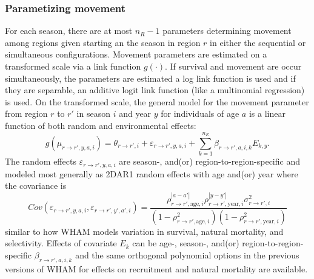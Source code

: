 \documentclass[
]{article}
\begin{document}
\hypertarget{parametizing-movement}{%
\subsubsection*{Parametizing movement}\label{parametizing-movement}}

For each season, there are at most \(n_R-1\) parameters determining
movement among regions given starting an the season in region \(r\) in
either the sequential or simultaneous configurations. Movement
parameters are estimated on a transformed scale via a link function
\(g(\cdot)\). If survival and movement are occur simultaneously, the
parameters are estimated a log link function is used and if they are
separable, an additive logit link function (like a multinomial
regression) is used. On the transformed scale, the general model for the
movement parameter from region \(r\) to \(r'\) in season \(i\) and year
\(y\) for individuals of age \(a\) is a linear function of both random
and environmental effects: \begin{equation*}
  g(\mu_{r\rightarrow r',y,a,i}) = \theta_{r\rightarrow r',i} + \varepsilon_{r\rightarrow r',y,a,i} + \sum^{n_E}_{k=1} \beta_{r \rightarrow r',a,i,k} E_{k,y}.
\end{equation*} The random effects
\(\varepsilon_{r\rightarrow r',y,a,i}\) are season-, and(or)
region-to-region-specific and modeled most generally as 2DAR1 random
effects with age and(or) year where the covariance is \begin{equation*}
  Cov\left(\varepsilon_{r\rightarrow r',y,a,i},\varepsilon_{r\rightarrow r',y',a',i}\right) =   \frac{\rho_{r\rightarrow r',\text{age},i}^{|a-a'|}\rho_{r\rightarrow r',\text{year},i}^{|y-y'|}\sigma^2_{r\rightarrow r',i}}{\left(1 -  \rho_{r\rightarrow r',\text{age},i}^2\right)\left(1 - \rho_{r\rightarrow r',\text{year},i}^2\right)}
\end{equation*} similar to how WHAM models variation in survival,
natural mortality, and selectivity. Effects of covariate \(E_k\) can be
age-, season-, and(or) region-to-region-specific
\(\beta_{r\rightarrow r',a,i,k}\) and the same orthogonal polynomial
options in the previous versions of WHAM for effects on recruitment and
natural mortality are available.
\end{document}
